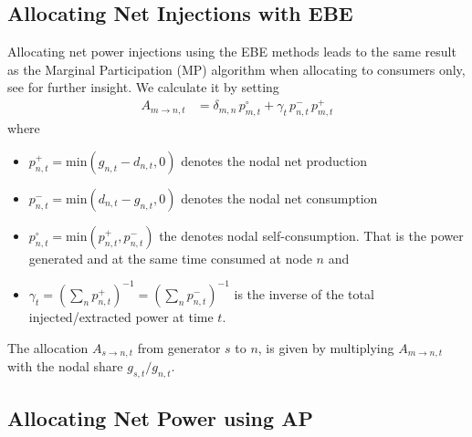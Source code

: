 \documentclass[11pt,twocolumn]{article}
\newcommand{\generation}{g_{s,t}}
\newcommand{\nodalgeneration}[1][n]{g_{#1,t}}
\newcommand{\nodaldemand}[1][n]{d_{#1,t}}
\newcommand{\injection}{p_{n,t}}
\newcommand{\netconsumption}[1][n]{p^{-}_{#1,t}}
\newcommand{\netproduction}[1][n]{p^{+}_{#1,t}}
\newcommand{\selfconsumption}[1][n]{p^{\circ}_{#1,t}}
\newcommand{\allocatePeer}[1][s \rightarrow n]{A_{#1,t}}
\begin{document}
\subsection{Allocating Net Injections with EBE}
\label{sec:net_ebe}

Allocating net power injections using the EBE methods leads to the same result as the Marginal Participation (MP) \cite{rudnick_marginal_1995}  algorithm when allocating to consumers only, see \cite{hofmann_flow_2020-1} for further insight. We calculate it by setting 
\begin{align}
\allocatePeer[m \rightarrow n] &=  \delta_{m,n}\,\selfconsumption[m] + \gamma_t \, \netconsumption  \, \netproduction[m]
\label{eq:mp_slack}
\end{align}
where 
\begin{itemize}
\item $\netproduction = \text{min}\left( \nodalgeneration - \nodaldemand , 0 \right) $ denotes the nodal net production 
\item $\netconsumption = \text{min}\left( \nodaldemand  - \nodalgeneration, 0 \right)$ denotes the nodal net consumption
\item $\selfconsumption = \text{min}\left( \netproduction, \netconsumption \right)$ the denotes  nodal self-consumption. That is the power generated and at the same time consumed at node $n$ and 
\item $\gamma_t = \left( \sum_n \netproduction\right) ^{-1} = \left( \sum_n \netconsumption\right) ^{-1}$ is the inverse of the total injected/extracted power at time $t$.
\end{itemize}

The allocation $\allocatePeer$ from generator $s$ to $n$, is given by multiplying $\allocatePeer[m \rightarrow n]$ with the nodal share $\generation / \nodalgeneration$.


\subsection{Allocating Net Power using AP}
\label{sec:net_ap}

\newcommand{\incidenceM}{K}
\newcommand{\flowM}{f}
\newcommand{\injectionM}{p}
\newcommand{\slackM}{k}
\newcommand{\DirectedIncidence}{\mathcal{K}}
\newcommand{\InverseAPInjection}{\mathcal{J}}
\newcommand\diag[1]{\operatorname{diag}\left(#1\right)}
\end{document}
